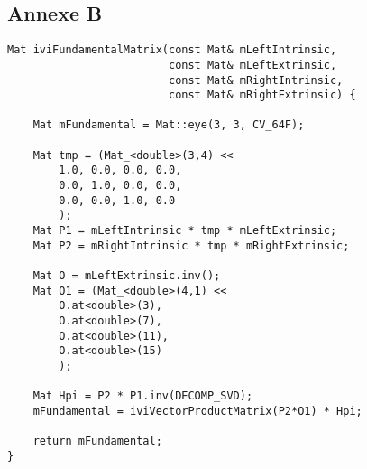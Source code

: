 \documentclass[a4paper,10pt]{article}
\begin{document}
\subsection{Annexe B}
\label{Afondamentale}
\begin{lstlisting}[caption=Calcul matrice fondamentale]
 Mat iviFundamentalMatrix(const Mat& mLeftIntrinsic,
                         const Mat& mLeftExtrinsic,
                         const Mat& mRightIntrinsic,
                         const Mat& mRightExtrinsic) {
                         
    Mat mFundamental = Mat::eye(3, 3, CV_64F);
   
    Mat tmp = (Mat_<double>(3,4) <<
        1.0, 0.0, 0.0, 0.0,
        0.0, 1.0, 0.0, 0.0,
        0.0, 0.0, 1.0, 0.0
        );
    Mat P1 = mLeftIntrinsic * tmp * mLeftExtrinsic;
    Mat P2 = mRightIntrinsic * tmp * mRightExtrinsic;

    Mat O = mLeftExtrinsic.inv();
    Mat O1 = (Mat_<double>(4,1) <<
        O.at<double>(3),
        O.at<double>(7),
        O.at<double>(11),
        O.at<double>(15)
        );

    Mat Hpi = P2 * P1.inv(DECOMP_SVD);
    mFundamental = iviVectorProductMatrix(P2*O1) * Hpi;

    return mFundamental;
}
\end{lstlisting}
\end{document}
